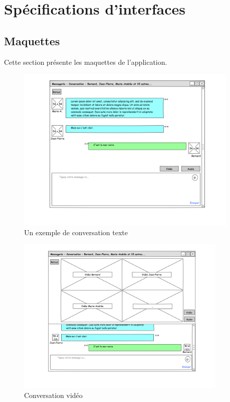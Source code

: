 \documentclass[11pt,dvipsnames,svgnames]{report}
\begin{document}
\section{Spécifications d'interfaces}
\subsection*{Maquettes}

Cette section présente les maquettes de l'application.

\begin{figure}[H]
\centerline{\includegraphics[width=0.95\textwidth]{maquette/maquette1.png}}
\caption{Un exemple de conversation texte}
\end{figure}

\begin{figure}[H]
\centerline{\includegraphics[width=0.9\textwidth]{maquette/maquette4.png}}
\caption{Conversation vidéo}
\end{figure}
\end{document}
